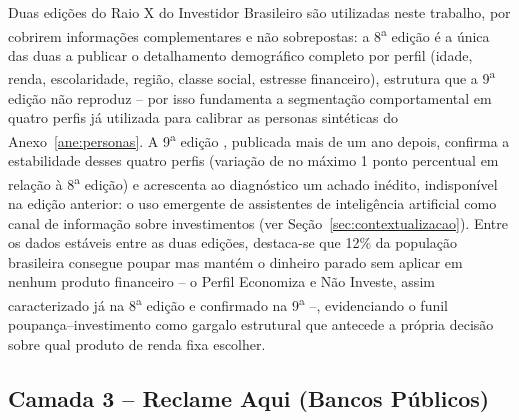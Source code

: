 Duas edi\c{c}\~oes do Raio X do Investidor Brasileiro s\~ao utilizadas
neste trabalho, por cobrirem informa\c{c}\~oes complementares e n\~ao
sobrepostas: a 8\textsuperscript{a} edi\c{c}\~ao \autocite{anbima2025}
\'e a \'unica das duas a publicar o detalhamento demogr\'afico completo
por perfil (idade, renda, escolaridade, regi\~ao, classe social,
estresse financeiro), estrutura que a 9\textsuperscript{a} edi\c{c}\~ao
n\~ao reproduz -- por isso fundamenta a segmenta\c{c}\~ao comportamental
em quatro perfis j\'a utilizada para calibrar as personas sint\'eticas
do Anexo~\ref{ane:personas}. A 9\textsuperscript{a} edi\c{c}\~ao
\autocite{anbima2026}, publicada mais de um ano depois, confirma a
estabilidade desses quatro perfis (varia\c{c}\~ao de no m\'aximo 1
ponto percentual em rela\c{c}\~ao \`a 8\textsuperscript{a} edi\c{c}\~ao)
e acrescenta ao diagn\'ostico um achado in\'edito, indispon\'ivel na
edi\c{c}\~ao anterior: o uso emergente de assistentes de
intelig\^encia artificial como canal de informa\c{c}\~ao sobre
investimentos (ver Se\c{c}\~ao~\ref{sec:contextualizacao}). Entre os
dados est\'aveis entre as duas edi\c{c}\~oes, destaca-se que 12\% da
popula\c{c}\~ao brasileira consegue poupar mas mant\'em o dinheiro
parado sem aplicar em nenhum produto financeiro -- o Perfil Economiza
e N\~ao Investe, assim caracterizado j\'a na 8\textsuperscript{a}
edi\c{c}\~ao \autocite{anbima2025} e confirmado na
9\textsuperscript{a} --, evidenciando o funil
poupan\c{c}a--investimento como gargalo estrutural que antecede a
pr\'opria decis\~ao sobre qual produto de renda fixa escolher.

\subsection{Camada 3 -- Reclame Aqui (Bancos P\'ublicos)}
\label{subsec:camada3}

